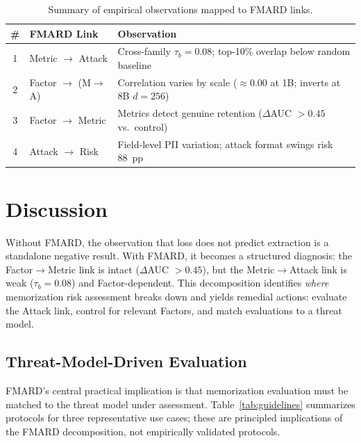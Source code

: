 \documentclass[11pt]{article}
\begin{document}
\begin{table}[t]
\centering
\footnotesize
\begin{tabular}{@{}cp{2.8cm}p{4.0cm}@{}}
\toprule
\# & \textbf{FMARD Link} & \textbf{Observation} \\
\midrule
1 & Metric $\to$ Attack &
  Cross-family $\tau_b = 0.08$; top-10\% overlap below random baseline \\
2 & Factor $\to$ (M$\to$A) &
  Correlation varies by scale (${\approx}0.00$ at 1B; inverts at 8B $d{=}256$) \\
3 & Factor $\to$ Metric &
  Metrics detect genuine retention ($\Delta$AUC $> 0.45$ vs.\ control) \\
4 & Attack $\to$ Risk &
  Field-level PII variation; attack format swings risk 88~pp \\
\bottomrule
\end{tabular}
\caption{Summary of empirical observations mapped to FMARD links.}
\label{tab:summary}
\end{table}


\section{Discussion}
\label{sec:discussion}

Without FMARD, the observation that loss does not predict extraction is a
standalone negative result.
With FMARD, it becomes a structured diagnosis: the Factor$\to$Metric link is
intact ($\Delta$AUC $> 0.45$), but the Metric$\to$Attack link is weak
($\tau_b = 0.08$) and Factor-dependent.
This decomposition identifies \textit{where} memorization risk assessment
breaks down and yields remedial actions: evaluate the Attack link, control for
relevant Factors, and match evaluations to a threat model.

\subsection{Threat-Model-Driven Evaluation}

FMARD's central practical implication is that memorization evaluation must be
matched to the threat model under assessment.
Table~\ref{tab:guidelines} summarizes protocols for three representative use
cases; these are principled implications of the FMARD decomposition, not
empirically validated protocols.
\end{document}
